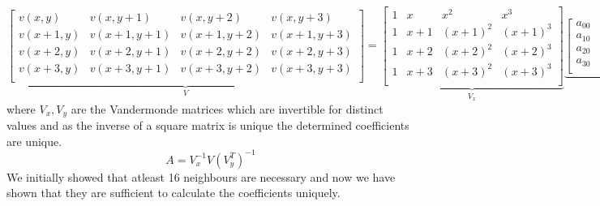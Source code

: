 \documentclass[a4paper, landscape]{article}
\begin{document}
\begin{equation}
    \underbrace{
    \begin{bmatrix}
        v(x,y) & v(x,y+1) & v(x,y+2) & v(x,y+3)\\
        v(x+1,y) & v(x+1,y+1) & v(x+1,y+2) & v(x+1,y+3)\\
        v(x+2,y) & v(x+2,y+1) & v(x+2,y+2) & v(x+2,y+3)\\
        v(x+3,y) & v(x+3,y+1) & v(x+3,y+2) & v(x+3,y+3)\\
    \end{bmatrix}
    }_{V}
    =
    \underbrace{
    \begin{bmatrix}
        1 & x & x^2 & x^3\\
        1 & x+1 & (x+1)^2 & (x+1)^3\\
        1 & x+2 & (x+2)^2 & (x+2)^3\\
        1 & x+3 & (x+3)^2 & (x+3)^3\\
    \end{bmatrix}
    }_{V_x}
    \underbrace{
    \begin{bmatrix}
        a_{00} & a_{01} & a_{02} & a_{03}\\
        a_{10} & a_{11} & a_{12} & a_{13}\\
        a_{20} & a_{21} & a_{22} & a_{23}\\
        a_{30} & a_{31} & a_{32} & a_{33}\\
    \end{bmatrix}
     }_{A}
    \underbrace{
    \begin{bmatrix}
        1 & 1 & 1 & 1 \\ y & y+1 & y+2 & y+3 \\y^2 & (y+1)^2 & (y+2)^2 & (y+3)^2  \\ y^3 & (y+1)^3 & (y+2)^3 & (y+3)^3
    \end{bmatrix}
     }_{V_y^T}
\end{equation}
where $V_x, V_y$ are the Vandermonde matrices which are invertible for distinct values and as the inverse of a square matrix is unique the determined coefficients are unique. 
\begin{equation}
    A = V_x^{-1} V (V_y^{T})^{-1}
\end{equation}
We initially showed that atleast 16 neighbours are necessary and now we have shown that they are sufficient to calculate the coefficients uniquely.
\end{document}
